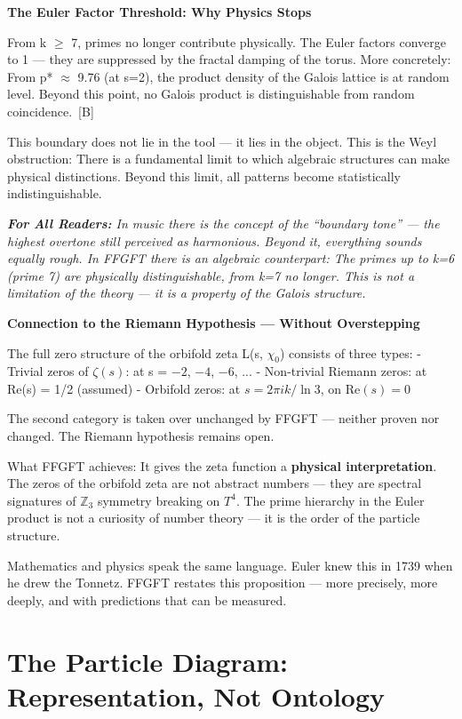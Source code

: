 \documentclass[11pt,oneside]{book}
\newcommand{\status}[1]{\penalty10000\,{\scriptsize\textcolor{gray!60}{[#1]}}}
\newenvironment{laierspur}{%
  \par\vspace{4pt}%
  \noindent\small\itshape\color{blue!60!black}%
  \textbf{For All Readers:}\enspace\ignorespaces}{%
  \par\vspace{4pt}\normalsize\normalfont\normalcolor}
\begin{document}
\textbf{The Euler Factor Threshold: Why Physics Stops}

From k $\geq$ 7, primes no longer contribute physically. The Euler factors
converge to 1 — they are suppressed by the fractal damping of the torus.
More concretely: From p* $\approx$ 9.76 (at s=2), the product density of the
Galois lattice is at random level. Beyond this point, no Galois product is
distinguishable from random coincidence. \status{B}

This boundary does not lie in the tool — it lies in the object. This is the
Weyl obstruction: There is a fundamental limit to which algebraic structures
can make physical distinctions. Beyond this limit, all patterns become
statistically indistinguishable.

\begin{laierspur}
In music there is the concept of the \enquote{boundary tone} — the highest
overtone still perceived as harmonious. Beyond it, everything sounds equally
rough. In FFGFT there is an algebraic counterpart: The primes up to k=6
(prime 7) are physically distinguishable, from k=7 no longer. This is not a
limitation of the theory — it is a property of the Galois structure.
\end{laierspur}

\textbf{Connection to the Riemann Hypothesis — Without Overstepping}

The full zero structure of the orbifold zeta L(s, $\chi_0$) consists of
three types:
- Trivial zeros of $\zeta(s)$: at s = $-2$, $-4$, $-6$, ...
- Non-trivial Riemann zeros: at Re(s) = 1/2 (assumed)
- Orbifold zeros: at $s = 2\pi i k/\ln 3$, on $\mathrm{Re}(s) = 0$

The second category is taken over unchanged by FFGFT — neither proven nor
changed. The Riemann hypothesis remains open.

What FFGFT achieves: It gives the zeta function a \textbf{physical
interpretation}. The zeros of the orbifold zeta are not abstract numbers —
they are spectral signatures of $\mathbb{Z}_3$ symmetry breaking on $T^4$.
The prime hierarchy in the Euler product is not a curiosity of number theory —
it is the order of the particle structure.

Mathematics and physics speak the same language. Euler knew this in 1739
when he drew the Tonnetz. FFGFT restates this proposition — more precisely,
more deeply, and with predictions that can be measured.


\chapter{The Particle Diagram: Representation, Not Ontology}
\end{document}
